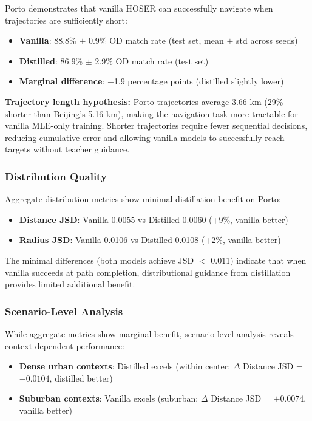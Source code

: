 Porto demonstrates that vanilla HOSER can successfully navigate when trajectories are sufficiently short:
\begin{itemize}[leftmargin=*,noitemsep]
    \item \textbf{Vanilla}: 88.8\% $\pm$ 0.9\% OD match rate (test set, mean $\pm$ std across seeds)
    \item \textbf{Distilled}: 86.9\% $\pm$ 2.9\% OD match rate (test set)
    \item \textbf{Marginal difference}: $-$1.9 percentage points (distilled slightly lower)
\end{itemize}

\textbf{Trajectory length hypothesis:} Porto trajectories average 3.66 km (29\% shorter than Beijing's 5.16 km), making the navigation task more tractable for vanilla MLE-only training. Shorter trajectories require fewer sequential decisions, reducing cumulative error and allowing vanilla models to successfully reach targets without teacher guidance.

\subsubsection{Distribution Quality}

Aggregate distribution metrics show minimal distillation benefit on Porto:
\begin{itemize}[leftmargin=*,noitemsep]
    \item \textbf{Distance JSD}: Vanilla 0.0055 vs Distilled 0.0060 (+9\%, vanilla better)
    \item \textbf{Radius JSD}: Vanilla 0.0106 vs Distilled 0.0108 (+2\%, vanilla better)
\end{itemize}

The minimal differences (both models achieve JSD $<$ 0.011) indicate that when vanilla succeeds at path completion, distributional guidance from distillation provides limited additional benefit.

\subsubsection{Scenario-Level Analysis}

While aggregate metrics show marginal benefit, scenario-level analysis reveals context-dependent performance:
\begin{itemize}[leftmargin=*,noitemsep]
    \item \textbf{Dense urban contexts}: Distilled excels (within center: $\Delta$ Distance JSD = $-0.0104$, distilled better)
    \item \textbf{Suburban contexts}: Vanilla excels (suburban: $\Delta$ Distance JSD = $+0.0074$, vanilla better)
\end{itemize}


